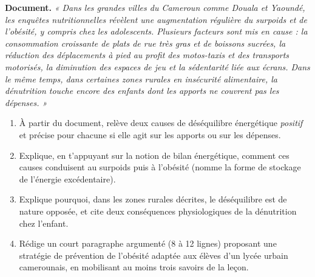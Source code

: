 \documentclass[11pt]{article}
\begin{document}
\begin{exercice}
\textbf{Document.} \emph{« Dans les grandes villes du Cameroun comme Douala et Yaoundé, les enquêtes nutritionnelles révèlent une augmentation régulière du surpoids et de l'obésité, y compris chez les adolescents. Plusieurs facteurs sont mis en cause : la consommation croissante de plats de rue très gras et de boissons sucrées, la réduction des déplacements à pied au profit des motos-taxis et des transports motorisés, la diminution des espaces de jeu et la sédentarité liée aux écrans. Dans le même temps, dans certaines zones rurales en insécurité alimentaire, la dénutrition touche encore des enfants dont les apports ne couvrent pas les dépenses. »}
\begin{enumerate}
\item À partir du document, relève deux causes de déséquilibre énergétique \emph{positif} et précise pour chacune si elle agit sur les apports ou sur les dépenses.
\item Explique, en t'appuyant sur la notion de bilan énergétique, comment ces causes conduisent au surpoids puis à l'obésité (nomme la forme de stockage de l'énergie excédentaire).
\item Explique pourquoi, dans les zones rurales décrites, le déséquilibre est de nature opposée, et cite deux conséquences physiologiques de la dénutrition chez l'enfant.
\item Rédige un court paragraphe argumenté (8 à 12 lignes) proposant une stratégie de prévention de l'obésité adaptée aux élèves d'un lycée urbain camerounais, en mobilisant au moins trois savoirs de la leçon.
\end{enumerate}
\end{exercice}
\end{document}
